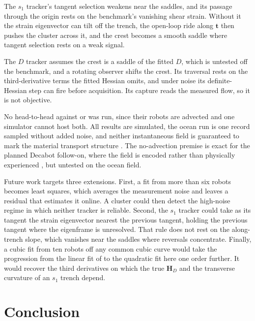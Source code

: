 \documentclass[lettersize,journal]{IEEEtran}
\begin{document}
The $s_1$ tracker's tangent selection weakens near the saddles, and its
passage through the origin rests on the benchmark's vanishing shear
strain. Without it the strain eigenvector
can tilt off the trench, the open-loop ride along $\mathbf{t}$ then
pushes the cluster across it, and the crest becomes a smooth saddle where
tangent selection rests on a weak signal.

The $D$ tracker assumes the crest is a saddle of the fitted $D$, which is
untested off the benchmark, and a rotating observer shifts the crest. Its
traversal rests on the third-derivative terms the fitted Hessian omits,
and under noise its definite-Hessian step can fire before acquisition.
Its capture reads the measured flow, so it is not objective.

No head-to-head against \cite{26,27,28} or \cite{29} was run, since
their robots are advected and one simulator cannot host both. All results
are simulated, the ocean run is one record sampled without added noise,
and neither instantaneous field is guaranteed to mark the material
transport structure \cite{18}. The no-advection premise is exact for the
planned Decabot follow-on, where the field is encoded rather than
physically experienced \cite{32}, but untested on the ocean field.

Future work targets three extensions. First, a fit from more than six
robots becomes least squares, which averages the measurement noise and
leaves a residual that estimates it online. A cluster could then detect the
high-noise regime in which neither tracker is reliable. Second, the
$s_1$ tracker could take as its tangent the strain eigenvector nearest the
previous tangent, holding the previous tangent where the eigenframe is
unresolved. That rule does not rest on the along-trench slope, which
vanishes near the saddles where reversals concentrate. Finally, a cubic fit
from ten robots off any common cubic curve would take the progression from
the linear fit of \cite{10} to the quadratic fit here one order further. It
would recover the third derivatives on which the true $\mathbf{H}_D$ and
the transverse curvature of an $s_1$ trench depend.

\section{Conclusion}
\end{document}
